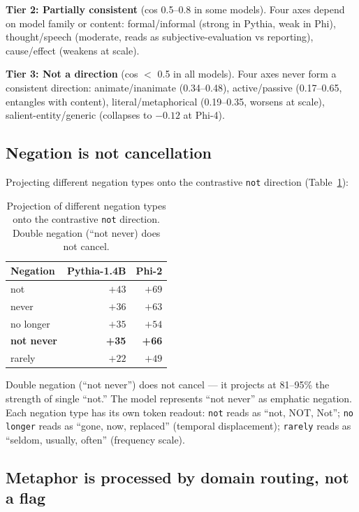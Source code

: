 \documentclass[11pt]{article}
\begin{document}
\textbf{Tier 2: Partially consistent} (cos 0.5--0.8 in some models).
Four axes depend on model family or content: formal/informal (strong in
Pythia, weak in Phi), thought/speech (moderate, reads as
subjective-evaluation vs reporting), cause/effect (weakens at scale).

\textbf{Tier 3: Not a direction} (cos $<$ 0.5 in all models).
Four axes never form a consistent direction: animate/inanimate (0.34--0.48),
active/passive (0.17--0.65, entangles with content), literal/metaphorical
(0.19--0.35, worsens at scale), salient-entity/generic (collapses to $-0.12$
at Phi-4).

\subsection{Negation is not cancellation}

Projecting different negation types onto the contrastive \texttt{not} direction (Table~\ref{tab:negation}):

\begin{table}[htbp]
\centering
\small
\begin{tabular}{lrr}
\toprule
Negation & Pythia-1.4B & Phi-2 \\
\midrule
not & $+43$ & $+69$ \\
never & $+36$ & $+63$ \\
no longer & $+35$ & $+54$ \\
\textbf{not never} & \textbf{+35} & \textbf{+66} \\
rarely & $+22$ & $+49$ \\
\bottomrule
\end{tabular}
\caption{Projection of different negation types onto the contrastive \texttt{not} direction. Double negation (``not never) does not cancel.}
\label{tab:negation}
\end{table}

Double negation (``not never'') does not cancel --- it projects at 81--95\% the
strength of single ``not.'' The model represents ``not never'' as emphatic
negation. Each negation type has its own token readout: \texttt{not} reads as
``not, NOT, Not''; \texttt{no longer} reads as ``gone, now, replaced'' (temporal
displacement); \texttt{rarely} reads as ``seldom, usually, often'' (frequency scale).

\subsection{Metaphor is processed by domain routing, not a flag}
\end{document}
